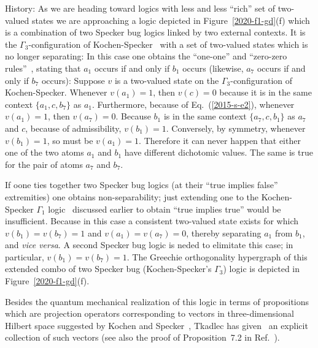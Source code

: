 History:
As we are heading toward  logics with less and less ``rich'' set of two-valued states we are approaching
a logic   depicted in Figure~\ref{2020-f1-gd}(f)
which is a combination of two Specker bug logics linked by two external contexts.
It is the $\Gamma_3$-configuration of Kochen-Specker~\cite[p.~70]{kochen1}
with a set of two-valued states which is no longer separating:
In this case one obtains the ``one-one'' and ``zero-zero rules''~\cite{svozil-2006-omni},
stating that  $a_1$ occurs if and only if $b_1$ occurs
(likewise, $a_7$ occurs if and only if $b_7$ occurs):
Suppose $v$ is a two-valued state on the $\Gamma_3$-configuration of Kochen-Specker.
Whenever $v(a_1)=1$, then $v(c)=0$ because it is in the same context $\{a_1,c,b_7\}$ as $a_1$.
Furthermore, because of Eq.~(\ref{2015-s-e2}), whenever $v(a_1)=1$, then $v(a_7)=0$.
Because $b_1$ is in the same context $\{a_7,c,b_1\}$ as $a_7$ and $c$, because of admissibility, $v(b_1)=1$.
Conversely, by symmetry, whenever $v(b_1)=1$, so must be $v(a_1)=1$.
Therefore it can never happen that either one of the two atoms $a_1$ and $b_1$ have different dichotomic values.
The same is true for the pair of atoms  $a_7$ and $b_7$.

If oone ties together two Specker bug logics  (at their ``true implies false'' extremities)
one  obtains non-separability;
just extending one to the
Kochen-Specker $\Gamma_1$ logic~\cite[p.~68]{kochen1}
discussed earlier to obtain ``true implies true'' would be insufficient.
Because in this case a consistent two-valued state exists for which $v(b_1)=v(b_7)=1$ and $v(a_1)=v(a_7)=0$,
thereby separating $a_1$ from $b_1$, and {\it vice versa}.
A second Specker bug logic is neded to elimitate this case; in particular, $v(b_1)=v(b_7)=1$.
The Greechie orthogonality hypergraph of this extended combo of two Specker bug (Kochen-Specker's $\Gamma_3$)
logic is depicted in Figure~\ref{2020-f1-gd}(f).




Besides the  quantum mechanical realization of this logic in terms of propositions which are projection operators
corresponding to vectors in three-dimensional Hilbert space suggested by Kochen and Specker~\cite{kochen1},
Tkadlec has given~\cite[p.~206, Figure~1]{tkadlec-96}  an explicit collection of such vectors
(see also the proof of Proposition~7.2 in Ref.~\cite[p.~5392]{svozil-tkadlec}).

\setlength{\tabcolsep}{0.33em}

